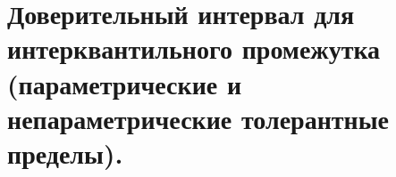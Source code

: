 \documentclass[polytech/stats/exam-2023/stats-exam-2023.tex]{subfiles}
\begin{document}
\section{Доверительный интервал для интерквантильного промежутка (параметрические и непараметрические толерантные пределы).}
\end{document}
